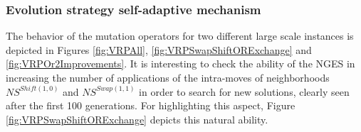 \documentclass{endm}
\begin{document}
\subsubsection{Evolution strategy self-adaptive mechanism} \label{subSubSec:HFVRP:AutoAdaptiveES}

The behavior of the mutation operators for two different large scale instances is depicted in Figures \ref{fig:VRPAll}, \ref{fig:VRPSwapShiftORExchange} and \ref{fig:VRPOr2Improvements}.
It is interesting to check the ability of the NGES in increasing the number of applications of the intra-moves of neighborhoods $NS^{Shift(1,0)}$ and $NS^{Swap(1,1)}$ in order to search for new solutions, clearly seen after the first 100 generations.
For highlighting this aspect, Figure \ref{fig:VRPSwapShiftORExchange} depicts this natural ability.
\end{document}
